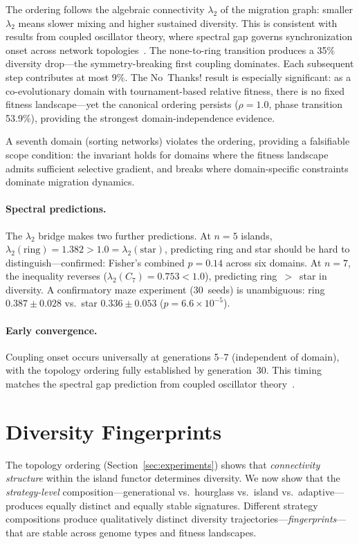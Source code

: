 \documentclass[dvipsnames,format=sigconf,anonymous=true,review=false]{acmart}
\begin{document}
The ordering follows the algebraic connectivity $\lambda_2$ of the migration graph: smaller $\lambda_2$ means slower mixing and higher sustained diversity. This is consistent with results from coupled oscillator theory, where spectral gap governs synchronization onset across network topologies~\cite{sanz2026algebraic}. The none-to-ring transition produces a 35\% diversity drop---the symmetry-breaking first coupling dominates. Each subsequent step contributes at most 9\%. The No~Thanks! result is especially significant: as a co-evolutionary domain with tournament-based relative fitness, there is no fixed fitness landscape---yet the canonical ordering persists ($\rho = 1.0$, phase transition 53.9\%), providing the strongest domain-independence evidence.

A seventh domain (sorting networks) violates the ordering, providing a falsifiable scope condition: the invariant holds for domains where the fitness landscape admits sufficient selective gradient, and breaks where domain-specific constraints dominate migration dynamics.

\paragraph{Spectral predictions.}
The $\lambda_2$ bridge makes two further predictions. At $n{=}5$ islands, $\lambda_2(\text{ring}) = 1.382 > 1.0 = \lambda_2(\text{star})$, predicting ring and star should be hard to distinguish---confirmed: Fisher's combined $p = 0.14$ across six domains. At $n{=}7$, the inequality reverses ($\lambda_2(C_7) = 0.753 < 1.0$), predicting ring~$>$~star in diversity. A confirmatory maze experiment (30~seeds) is unambiguous: ring $0.387 \pm 0.028$ vs.\ star $0.336 \pm 0.053$ ($p = 6.6 \times 10^{-5}$).

\paragraph{Early convergence.}
Coupling onset occurs universally at generations 5--7 (independent of domain), with the topology ordering fully established by generation~30. This timing matches the spectral gap prediction from coupled oscillator theory~\cite{sanz2026algebraic}.

\section{Diversity Fingerprints}
\label{sec:fingerprints}

The topology ordering (Section~\ref{sec:experiments}) shows that \emph{connectivity structure} within the island functor determines diversity. We now show that the \emph{strategy-level} composition---generational vs.\ hourglass vs.\ island vs.\ adaptive---produces equally distinct and equally stable signatures. Different strategy compositions produce qualitatively distinct diversity trajectories---\emph{fingerprints}---that are stable across genome types and fitness landscapes.
\end{document}
